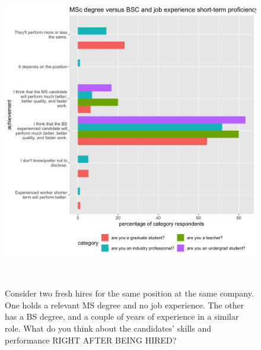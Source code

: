 \documentclass{sigchi}
\begin{document}
\begin{figure}
\includegraphics[scale=0.2]{../data-analysis/plots_output/MSc_degree_versus_BSC_and_job_experience_short-term_proficiency.png}
 \caption{Consider two fresh hires for the same position at the same company. One holds a relevant MS degree and no job experience. The other has a BS degree, and a couple of years of experience in a similar role. What do you think about the candidates' skills and performance RIGHT AFTER BEING HIRED?}~\label{fig:figure10}
\end{figure}
\end{document}
